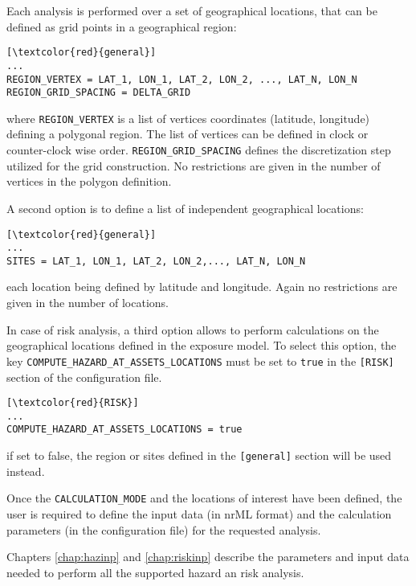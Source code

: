 Each analysis is performed over a set of geographical locations, that can be defined as grid points in a geographical region:

\begin{Verbatim}[frame=single, commandchars=\\\{\}, samepage=true]
[\textcolor{red}{general}]
...
REGION_VERTEX = LAT_1, LON_1, LAT_2, LON_2, ..., LAT_N, LON_N
REGION_GRID_SPACING = DELTA_GRID
\end{Verbatim}

where \Verb+REGION_VERTEX+ is a list of vertices coordinates (latitude, longitude) defining a polygonal region. The list of vertices can be defined in clock or counter-clock wise order. \Verb+REGION_GRID_SPACING+ defines the discretization step utilized for the grid construction. No restrictions are given in the number of vertices in the polygon definition.

A second option is to define a list of independent geographical locations:
\begin{Verbatim}[frame=single, commandchars=\\\{\}, samepage=true]
[\textcolor{red}{general}]
...
SITES = LAT_1, LON_1, LAT_2, LON_2,..., LAT_N, LON_N
\end{Verbatim}
each location being defined by latitude and longitude. Again no restrictions are given in the number of locations.

In case of risk analysis, a third option allows to perform calculations on the geographical locations defined in the exposure model. To select this option, the key \Verb+COMPUTE_HAZARD_AT_ASSETS_LOCATIONS+ must be set to \Verb+true+ in the \Verb+[RISK]+ section of the configuration file.
\begin{Verbatim}[frame=single, commandchars=\\\{\}, samepage=true]
[\textcolor{red}{RISK}]
...
COMPUTE_HAZARD_AT_ASSETS_LOCATIONS = true
\end{Verbatim}
if set to false, the region or sites defined in the \Verb+[general]+ section will be used instead.

Once the \Verb+CALCULATION_MODE+ and the locations of interest have been defined, the user is required to define the input data (in nrML format) and the calculation parameters (in the configuration file) for the requested analysis.

Chapters \ref{chap:hazinp} and \ref{chap:riskinp} describe the parameters and input data needed to perform all the supported hazard an risk analysis.